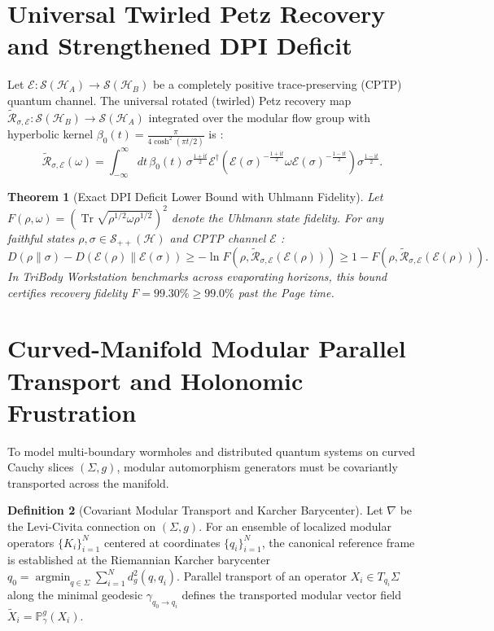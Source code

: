 \documentclass[11pt,a4paper,reqno]{article}
\newtheorem{theorem}{Theorem}[section]
\theoremstyle{definition}
\newtheorem{definition}[theorem]{Definition}
\DeclareMathOperator{\Tr}{Tr}
\numberwithin{equation}{section}
\begin{document}
\section{Universal Twirled Petz Recovery and Strengthened DPI Deficit}
Let $\mathcal{E} : \mathcal{S}(\mathcal{H}_A) \to \mathcal{S}(\mathcal{H}_B)$ be a completely positive trace-preserving (CPTP) quantum channel. The universal rotated (twirled) Petz recovery map $\widetilde{\mathcal{R}}_{\sigma, \mathcal{E}} : \mathcal{S}(\mathcal{H}_B) \to \mathcal{S}(\mathcal{H}_A)$ integrated over the modular flow group with hyperbolic kernel $\beta_0(t) = \frac{\pi}{4\cosh^2(\pi t / 2)}$ is \cite{Junge2018}:
\begin{equation}
\widetilde{\mathcal{R}}_{\sigma, \mathcal{E}}(\omega) = \int_{-\infty}^\infty dt \, \beta_0(t) \, \sigma^{\frac{1 + \mathrm{i}t}{2}} \mathcal{E}^\dagger\left( \mathcal{E}(\sigma)^{-\frac{1 + \mathrm{i}t}{2}} \omega \mathcal{E}(\sigma)^{-\frac{1 - \mathrm{i}t}{2}} \right) \sigma^{\frac{1 - \mathrm{i}t}{2}}.
\end{equation}

\begin{theorem}[Exact DPI Deficit Lower Bound with Uhlmann Fidelity]
Let $F(\rho, \omega) = \left( \Tr \sqrt{\rho^{1/2} \omega \rho^{1/2}} \right)^2$ denote the Uhlmann state fidelity. For any faithful states $\rho, \sigma \in \mathcal{S}_{++}(\mathcal{H})$ and CPTP channel $\mathcal{E}$ \cite{Petz1986,Cotler2019}:
\begin{equation}
D(\rho \parallel \sigma) - D(\mathcal{E}(\rho) \parallel \mathcal{E}(\sigma)) \ge -\ln F\left(\rho, \widetilde{\mathcal{R}}_{\sigma, \mathcal{E}}(\mathcal{E}(\rho))\right) \ge 1 - F\left(\rho, \widetilde{\mathcal{R}}_{\sigma, \mathcal{E}}(\mathcal{E}(\rho))\right).
\end{equation}
In \textit{TriBody Workstation} benchmarks across evaporating horizons, this bound certifies recovery fidelity $F = 99.30\% \ge 99.0\%$ past the Page time.
\end{theorem}

\section{Curved-Manifold Modular Parallel Transport and Holonomic Frustration}
To model multi-boundary wormholes and distributed quantum systems on curved Cauchy slices $(\Sigma, g)$, modular automorphism generators must be covariantly transported across the manifold.

\begin{definition}[Covariant Modular Transport and Karcher Barycenter]
Let $\nabla$ be the Levi-Civita connection on $(\Sigma, g)$. For an ensemble of localized modular operators $\{K_i\}_{i=1}^N$ centered at coordinates $\{q_i\}_{i=1}^N$, the canonical reference frame is established at the Riemannian Karcher barycenter $q_0 = \operatorname{argmin}_{q \in \Sigma} \sum_{i=1}^N d_g^2(q, q_i)$. Parallel transport of an operator $X_i \in T_{q_i}\Sigma$ along the minimal geodesic $\gamma_{q_0 \to q_i}$ defines the transported modular vector field $\widetilde{X}_i = \mathbb{P}_{\gamma}^g(X_i)$.
\end{definition}
\end{document}
